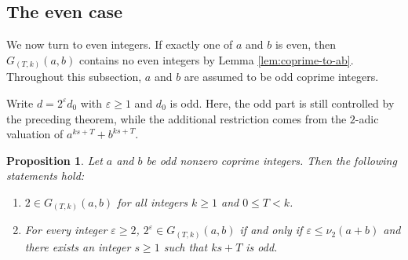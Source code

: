 \documentclass[pdflatex,sn-mathphys-num]{sn-jnl}%
\theoremstyle{thmstyleone}%
\newtheorem{proposition}[theorem]{Proposition}%
\theoremstyle{thmstyletwo}%
\theoremstyle{thmstylethree}%
\begin{document}
\subsection{The even case}
We now turn to even integers. If exactly one of $a$ and $b$ is even, then
$
G_{(T,k)}(a,b)$
contains no even integers by Lemma \ref{lem:coprime-to-ab}.  Throughout this subsection,  $a$ and $b$ are  assumed  to be odd coprime integers. 

Write $
d=2^\varepsilon d_0$ with $\varepsilon\ge 1$ and  $d_0$ is  odd. Here, the odd part is still controlled by the preceding theorem, while the additional restriction comes from the $2$-adic valuation of $a^{ks+T}+b^{ks+T}$.



 \begin{proposition}\label{prop:two-power}
Let $a$ and $b$ be odd nonzero coprime  integers. Then the following statements hold:
\begin{enumerate}[$(1)$]
    
\item 
$
2\in G_{(T,k)}(a,b)$
for all integers $k\ge 1$ and $0\le T<k$.

\item For every integer $\varepsilon\ge 2$,
$
2^\varepsilon\in G_{(T,k)}(a,b)$
if and only if $
\varepsilon\le \nu_2(a+b)$ and there exists an integer $s\ge 1$ such that
$
ks+T $ is odd.
\end{enumerate}
\end{proposition}
\end{document}
